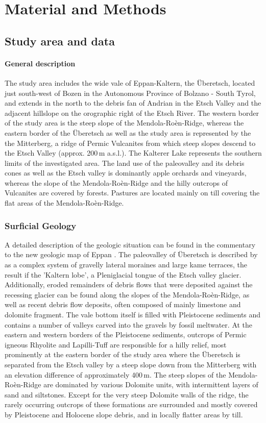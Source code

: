 \documentclass[preprint,12pt,authoryear]{elsarticle}
\begin{document}
\section{Material and Methods}
\subsection{Study area and data}
\paragraph{General description}
The study area includes the wide vale of Eppan-Kaltern, the {\"U}beretsch, located just south-west of Bozen in the Autonomous Province of Bolzano - South Tyrol, and extends in the north to the debris fan of Andrian in the Etsch Valley and the adjacent hillslope on the orographic right of the Etsch River. The western border of the study area is the steep slope of the Mendola-Ro\`en-Ridge, whereas the eastern border of the {\"U}beretsch as well as the study area is represented by the the Mitterberg, a ridge of Permic Vulcanites from which steep slopes descend to the Etsch Valley (approx. 200\,m a.s.l.). The Kalterer Lake represents the southern limits of the investigated area. The land use of the paleovalley and its debris cones as well as the Etsch valley is dominantly apple orchards and vineyards, whereas the slope of the  Mendola-Ro\`en-Ridge and the hilly outcrops of Vulcanites are covered by forests. Pastures are located mainly on till covering the flat areas of the  Mendola-Ro\`en-Ridge. 
\subsubsection{Surficial Geology}
A detailed  description of the geologic situation can be found in the commentary to the new geologic map of Eppan \citep{Avanzini2006}. 
The paleovalley of {\"U}beretsch is described by \cite{Scholz2005} as a complex system of gravelly lateral moraines and large kame terraces, the result if the 'Kaltern lobe', a Pleniglacial tongue of the Etsch valley glacier. Additionally, eroded remainders of debris flows that were deposited against the recessing glacier can be found along the slopes of the Mendola-Ro\`en-Ridge, as well as recent debris flow deposits, often composed of mainly limestone and dolomite fragment. The vale bottom itself is filled with Pleistocene sediments and contains a  number of valleys carved into the gravels by fossil meltwater. At the eastern and western borders of the Pleistocene sediments, outcrops of Permic igneous Rhyolite and Lapilli-Tuff are responsible for a hilly relief, most prominently at the eastern border of the study area where the {\"U}beretsch is separated from the Etsch valley by a steep slope down from the Mitterberg with an elevation difference of approximately 400\,m.   
The steep slopes of the Mendola-Ro\`en-Ridge are dominated by various Dolomite units, with intermittent layers of sand and siltstones. Except for the very steep Dolomite walls of the ridge, the rarely occurring outcrops of these formations are surrounded and mostly covered by Pleistocene and Holocene slope debris, and in locally flatter areas by till. 
 
\end{document}
